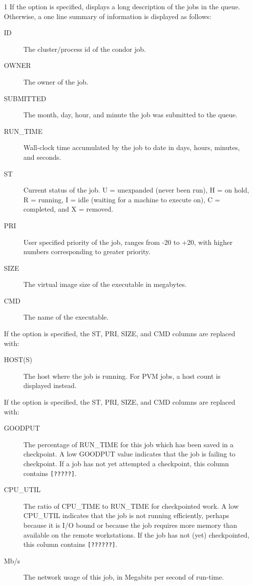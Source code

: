 \begin{ManPage}{\label{man-condor-q}}{1}
If the  option is specified,  displays a long description 
of the jobs in the queue.  Otherwise, a one line summary of information is
displayed as follows:

\begin{description}
\item[ID] The cluster/process id of the condor job. 
\item[OWNER] The owner of the job. 
\item[SUBMITTED] The month, day, hour, and minute the job was submitted to the 
	queue. 
\item[RUN\_TIME]  Wall-clock time accumulated by the job to date in days, 
	hours, minutes, and seconds.  
\item[ST] Current status of the job. U = unexpanded (never been run), H = on hold,
	R = running, I = idle (waiting for a machine to execute on), C = completed, 
	and X = removed. 
\item[PRI] User specified priority of the job, ranges from -20 to +20, with 
	higher numbers corresponding to greater priority. 
\item[SIZE] The virtual image size of the executable in megabytes. 
\item[CMD] The name of the executable. 
\end{description}

If the  option is specified, the ST, PRI, SIZE, and CMD
columns are replaced with:

\begin{description}
\item[HOST(S)] The host where the job is running.  For PVM jobs, a
host count is displayed instead.
\end{description}

If the  option is specified, the ST, PRI, SIZE, and CMD
columns are replaced with:

\begin{description}
\item[GOODPUT] The percentage of RUN\_TIME for this job which has been
saved in a checkpoint.  A low GOODPUT value indicates that the job is
failing to checkpoint.  If a job has not yet attempted a checkpoint,
this column contains \texttt{[?????]}.
\item[CPU\_UTIL] The ratio of CPU\_TIME to RUN\_TIME for checkpointed
work.  A low CPU\_UTIL indicates that the job is not running
efficiently, perhaps because it is I/O bound or because the job
requires more memory than available on the remote workstations.  If
the job has not (yet) checkpointed, this column contains \texttt{[??????]}.
\item[Mb/s] The network usage of this job, in Megabits per second of
run-time.
\end{description}


\end{ManPage}

